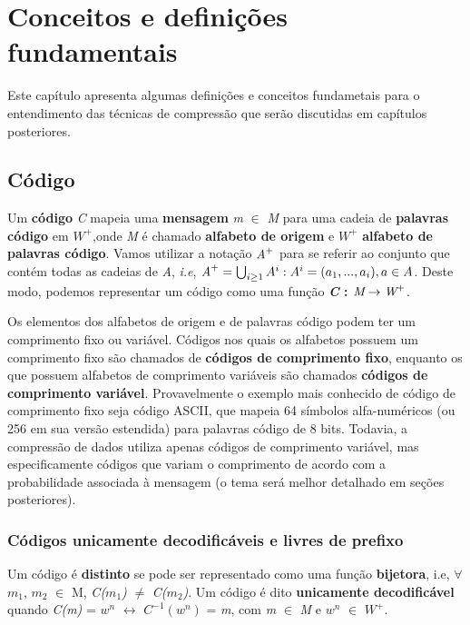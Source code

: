 \chapter{Conceitos e definições fundamentais}
Este capítulo apresenta algumas definições e conceitos fundametais para o entendimento das técnicas de compressão que serão discutidas em capítulos posteriores.

\section{Código}

Um \textbf{código} \emph{C} mapeia uma \textbf{mensagem} \emph{m} $\in$ \emph{M} para uma cadeia de \textbf{palavras código} em \emph{$W^+$},onde \emph{M} é chamado \textbf{alfabeto de origem} e \emph{$W^+$} \textbf{alfabeto de palavras código}. Vamos utilizar a notação $\emph{A}^+$ para se referir ao conjunto que contém todas as cadeias de \emph{A}, \emph{i.e}, $\emph{A}^+ = \bigcup_{i \geq 1}^{}A^{i} : A^i = (a_1,...,a_i), a \in A $. Deste modo, podemos representar um código como uma função \textbf{\emph{C} : $\emph{M} \rightarrow \emph{W}^+$}.

Os elementos dos alfabetos de origem e de palavras código podem ter um comprimento fixo ou variável. Códigos nos quais os alfabetos possuem um comprimento fixo são chamados de \textbf{códigos de comprimento fixo}, enquanto os que possuem alfabetos de comprimento variáveis são chamados \textbf{códigos de comprimento variável}. Provavelmente o exemplo mais conhecido de código de comprimento fixo seja código ASCII, que mapeia 64 símbolos alfa-numéricos (ou 256 em sua versão estendida) para palavras código de 8 bits. Todavia, a compressão de dados utiliza apenas códigos de comprimento variável, mas especificamente códigos que variam o comprimento de acordo com a probabilidade associada à mensagem (o tema será melhor detalhado em seções posteriores). 

\subsection{Códigos unicamente decodificáveis e livres de prefixo}
Um código é \textbf{distinto} se pode ser representado como uma função \textbf{bijetora}, i.e, $\forall$ $m_1$, $m_2$ $\in$ M, \emph{C($m_1$)} $\neq$ \emph{C($m_2$)}. Um código é dito \textbf{unicamente decodificável} quando \emph{C(m)} = $w^n$ $\leftrightarrow$ \emph{$C^{-1}(w^n)$} = \emph{m}, com \emph{m} $\in$ \emph{M} e \emph{$w^n$} $\in$ $W^+$.


